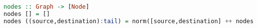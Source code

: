 \begin{lstlisting}[language=haskell]
nodes :: Graph -> [Node]
nodes [] = []
nodes ((source,destination):tail) = norm([source,destination] ++ nodes tail)
\end{lstlisting}